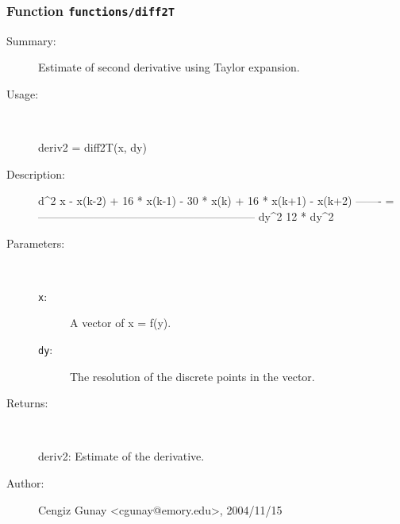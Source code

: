 \subsubsection[Function \texttt{diff2T}]{Function \texttt{functions/diff2T}}%
%
\label{ref_functions__diff2T}%
\hypertarget{ref_functions__diff2T}{}%
\begin{description}
\item[Summary:]Estimate of second derivative using Taylor expansion.
%
\item[Usage:]~%
\begin{lyxcode}%
deriv2 = diff2T(x, dy)
%
\end{lyxcode}%
%
\item[Description:]%
d\textasciicircum{}2 x     - x(k-2) + 16 * x(k-1) - 30 * x(k) + 16 * x(k+1) - x(k+2)
  ------- = -----------------------------------------------------------
   dy\textasciicircum{}2			        12 * dy\textasciicircum{}2
\item[Parameters:]~
\begin{description}%
\item[\texttt{x}:]
 A vector of x = f(y).
\item[\texttt{dy}:]
 The resolution of the discrete points in the vector.
\end{description}%
%
\item[Returns:]~

 	deriv2: Estimate of the derivative.
%
%
%
\item[Author:]%
Cengiz Gunay <cgunay@emory.edu>, 2004/11/15%
\end{description}
\methodline%
